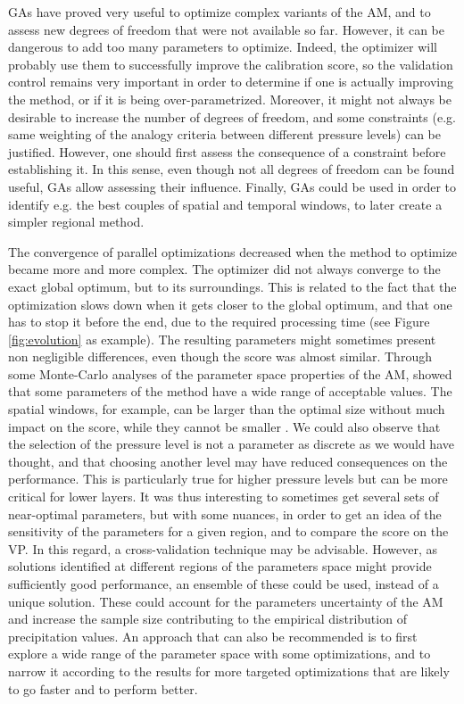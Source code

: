 \documentclass[review]{elsarticle}
\begin{document}
GAs have proved very useful to optimize complex variants of the AM, and to assess new degrees of freedom that were not available so far. However, it can be dangerous to add too many parameters to optimize. Indeed, the optimizer will probably use them to successfully improve the calibration score, so the validation control remains very important in order to determine if one is actually improving the method, or if it is being over-parametrized. Moreover, it might not always be desirable to increase the number of degrees of freedom, and some constraints (e.g. same weighting of the analogy criteria between different pressure levels) can be justified. However, one should first assess the consequence of a constraint before establishing it. In this sense, even though not all degrees of freedom can be found useful, GAs allow assessing their influence. Finally, GAs could be used in order to identify e.g. the best couples of spatial and temporal windows, to later create a simpler regional method.

The convergence of parallel optimizations decreased when the method to optimize became more and more complex. The optimizer did not always converge to the exact global optimum, but to its surroundings. This is related to the fact that the optimization slows down when it gets closer to the global optimum, and that one has to stop it before the end, due to the required processing time (see Figure \ref{fig:evolution} as example). The resulting parameters might sometimes present non negligible differences, even though the score was almost similar. Through some Monte-Carlo analyses of the parameter space properties of the AM, \citet{Horton2012a} showed that some parameters of the method have a wide range of acceptable values. The spatial windows, for example, can be larger than the optimal size without much impact on the score, while they cannot be smaller \citep[see also][]{Bontron2004}. We could also observe that the selection of the pressure level is not a parameter as discrete as we would have thought, and that choosing another level may have reduced consequences on the performance. This is particularly true for higher pressure levels but can be more critical for lower layers. It was thus interesting to sometimes get several sets of near-optimal parameters, but with some nuances, in order to get an idea of the sensitivity of the parameters for a given region, and to compare the score on the VP. In this regard, a cross-validation technique may be advisable. However, as solutions identified at different regions of the parameters space might provide sufficiently good performance, an ensemble of these could be used, instead of a unique solution. These could account for the parameters uncertainty of the AM and increase the sample size contributing to the empirical distribution of precipitation values. An approach that can also be recommended is to first explore a wide range of the parameter space with some optimizations, and to narrow it according to the results for more targeted optimizations that are likely to go faster and to perform better.
\end{document}
